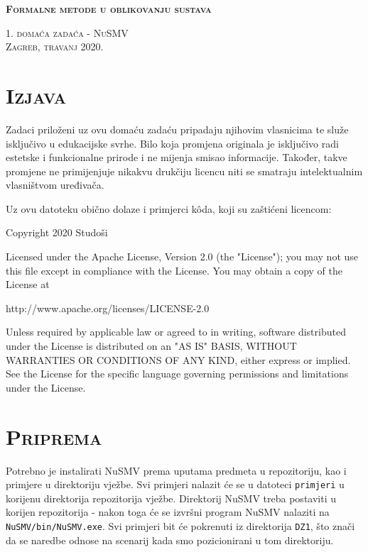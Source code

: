 \documentclass{article}
\newcommand{\crnotice}[1]
{
    \begin{center}
        \colorbox{red!15}{\parbox{\textwidth}{#1}}
    \end{center}
}
\newcommand{\sekcija}[1]{\section{\textsc{#1}}}
\newcommand{\code}[1]{\colorbox{blue!11}{\texttt{#1}}}
\begin{document}
\begin{titlepage}
    \centering
    \vspace*{\fill}

    \huge
    \textbf{\textsc{Formalne metode u oblikovanju sustava}} \\
    
    \vspace*{0.5cm}
    
    \large
    \textsc{1. domaća zadaća - NuSMV} \\

    \vspace*{\fill}
    \textsc{Zagreb, travanj 2020.}
\end{titlepage}

\tableofcontents
\pagebreak



\sekcija{Izjava}

Zadaci priloženi uz ovu domaću zadaću pripadaju njihovim vlasnicima te služe isključivo u edukacijske svrhe. Bilo koja promjena originala je isključivo radi estetske i funkcionalne prirode i ne mijenja smisao informacije. Također, takve promjene ne primijenjuje nikakvu drukčiju licencu niti se smatraju intelektualnim vlasništvom uređivača.
\newline

Uz ovu datoteku obično dolaze i primjerci kôda, koji su zaštićeni licencom:

\crnotice
{
    Copyright 2020 Studoši
    \newline

    Licensed under the Apache License, Version 2.0 (the "License");
    you may not use this file except in compliance with the License.
    You may obtain a copy of the License at
    \newline

        \quad
        http://www.apache.org/licenses/LICENSE-2.0
        \newline

    Unless required by applicable law or agreed to in writing, software
    distributed under the License is distributed on an "AS IS" BASIS,
    WITHOUT WARRANTIES OR CONDITIONS OF ANY KIND, either express or implied.
    See the License for the specific language governing permissions and
    limitations under the License.
}

\sekcija{Priprema}

Potrebno je instalirati NuSMV prema uputama predmeta u repozitoriju, kao i primjere u direktoriju vježbe. Svi primjeri nalazit će se u datoteci \code{primjeri} u korijenu direktorija repozitorija vježbe. Direktorij NuSMV treba postaviti u korijen repozitorija - nakon toga će se izvršni program NuSMV nalaziti na \code{NuSMV/bin/NuSMV.exe}. Svi primjeri bit će pokrenuti iz direktorija \code{DZ1}, što znači da se naredbe odnose na scenarij kada smo pozicionirani u tom direktoriju.
\end{document}

